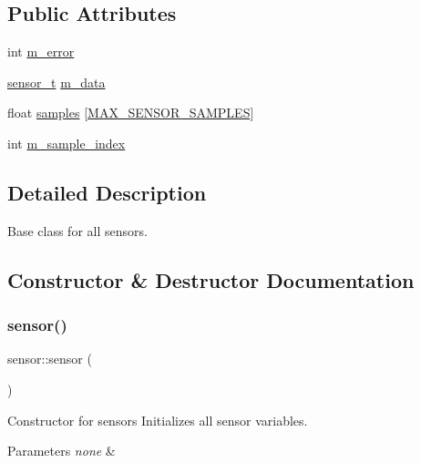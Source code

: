 \subsection*{Public Attributes}
\begin{DoxyCompactItemize}
\item 
int \hyperlink{classsensor_ae5e47730d9287ad3c933472361478adc}{m\+\_\+error}
\item 
\hyperlink{structsensor__t}{sensor\+\_\+t} \hyperlink{classsensor_ac3e288dfa5563c9ea1acfb2316815618}{m\+\_\+data}
\item 
float \hyperlink{classsensor_a795220a22d60a8babb9383b002342220}{samples} \mbox{[}\hyperlink{group___base_sensors_module_ga758742adca8f7b427482748255303be6}{M\+A\+X\+\_\+\+S\+E\+N\+S\+O\+R\+\_\+\+S\+A\+M\+P\+L\+ES}\mbox{]}
\item 
int \hyperlink{classsensor_a4216ce667ad8873d1a45f2a1505209da}{m\+\_\+sample\+\_\+index}
\end{DoxyCompactItemize}


\subsection{Detailed Description}
Base class for all sensors. 

\subsection{Constructor \& Destructor Documentation}
\mbox{\label{classsensor_aeaa38c2a2b5e33314a4fe9ff905dc0c6}} 
\subsubsection{\texorpdfstring{sensor()}{sensor()}}
{\footnotesize\ttfamily sensor\+::sensor (\begin{DoxyParamCaption}{ }\end{DoxyParamCaption})\hspace{0.3cm}{\ttfamily [inline]}}



Constructor for sensors Initializes all sensor variables. 


\begin{DoxyParams}{Parameters}
{\em none} & \\
\hline
\end{DoxyParams}



